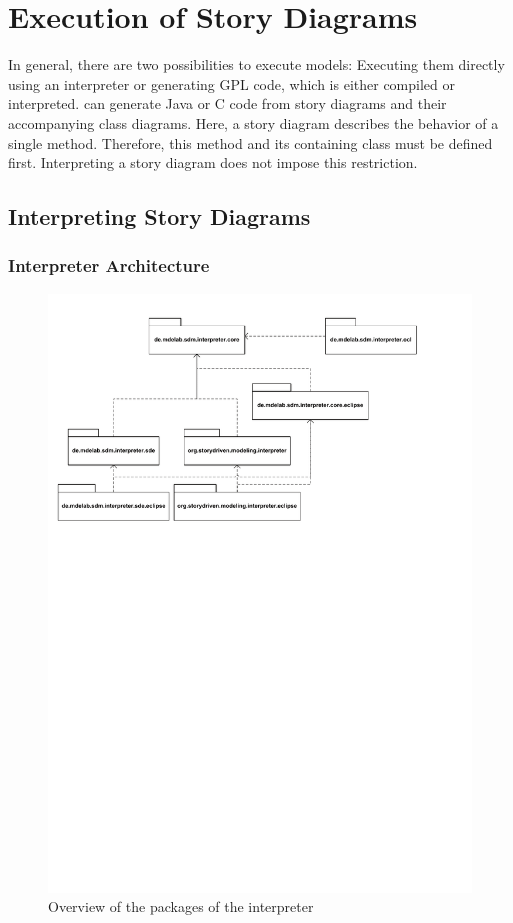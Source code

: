 \chapter{Execution of Story Diagrams}

In general, there are two possibilities to execute models: Executing them directly using an interpreter \cite{GHS09} or generating GPL code, which is either compiled or interpreted. \fuj can generate Java or C code from story diagrams and their accompanying class diagrams. Here, a story diagram describes the behavior of a single method. Therefore, this method and its containing class must be defined first. Interpreting a story diagram does not impose this restriction.


\section{Interpreting Story Diagrams}

\subsection{Interpreter Architecture}

\begin{figure}[htb]
  \centering
  \includegraphics[width=1.0\columnwidth]{./figures/interpreter_packages.pdf}
  \caption{Overview of the packages of the interpreter}
  \label{fig:interpreter_packages}
\end{figure}

